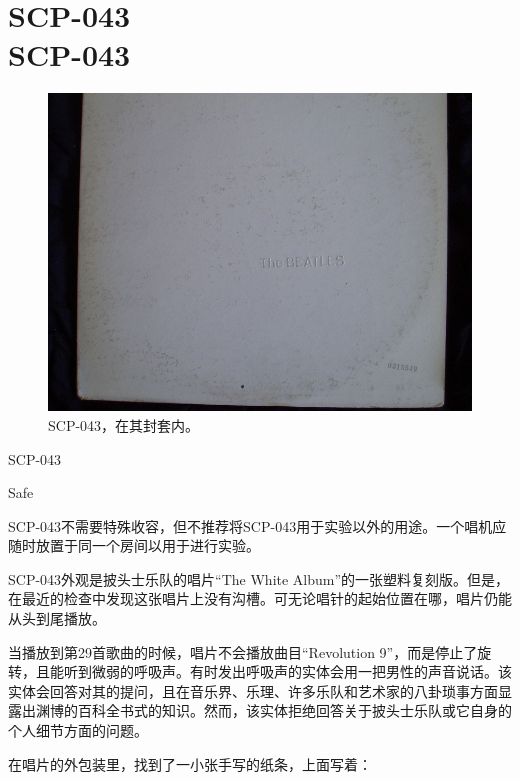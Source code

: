 \chapter[SCP-043]{
    SCP-043 \\
    SCP-043
}

\label{chap:SCP-043}

\begin{figure}[H]
    \centering
    \includegraphics[width=0.5\linewidth]{images/SCP.043.jpg}
    \caption*{SCP-043，在其封套内。}
\end{figure}

SCP-043

Safe

SCP-043不需要特殊收容，但不推荐将SCP-043用于实验以外的用途。一个唱机应随时放置于同一个房间以用于进行实验。

SCP-043外观是披头士乐队的唱片“The White Album”的一张塑料复刻版。但是，在最近的检查中发现这张唱片上没有沟槽。可无论唱针的起始位置在哪，唱片仍能从头到尾播放。

当播放到第29首歌曲的时候，唱片不会播放曲目“Revolution 9”，而是停止了旋转，且能听到微弱的呼吸声。有时发出呼吸声的实体会用一把男性的声音说话。该实体会回答对其的提问，且在音乐界、乐理、许多乐队和艺术家的八卦琐事方面显露出渊博的百科全书式的知识。然而，该实体拒绝回答关于披头士乐队或它自身的个人细节方面的问题。

在唱片的外包装里，找到了一小张手写的纸条，上面写着：

\begin{scpbox}




\end{scpbox}
